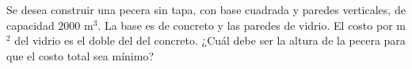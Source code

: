 %
%
%
%
%
%
%
%
%
%




\begin{prob}
Se desea construir una pecera sin tapa, con base cuadrada y paredes
verticales, de capacidad $2000$ m$^3$. La base es de concreto y las
paredes de vidrio. El costo por m$^2$ del vidrio es el doble del del
concreto. ¿Cuál debe ser la altura de la pecera para que el costo
total sea mínimo?
\end{prob}

